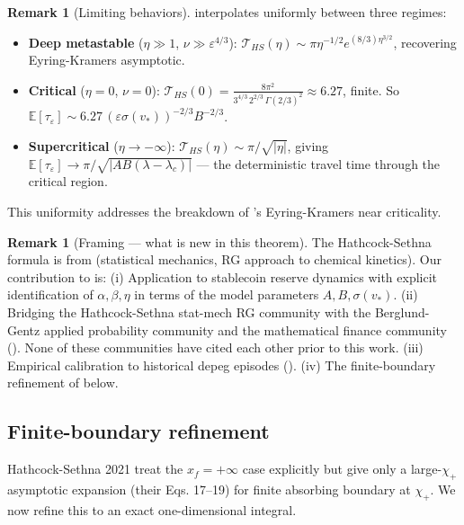 \documentclass[11pt,a4paper]{article}
\theoremstyle{plain}
\theoremstyle{definition}
\newtheorem{remark}[theorem]{Remark}
\newcommand{\E}{\mathbb{E}}
\newcommand{\eps}{\varepsilon}
\begin{document}
\begin{remark}[Limiting behaviors]
 interpolates uniformly between three regimes:
\begin{itemize}
\item \textbf{Deep metastable} ($\eta \gg 1$, $\nu \gg \eps^{4/3}$): $\mathcal T_{HS}(\eta) \sim \pi\eta^{-1/2}e^{(8/3)\eta^{3/2}}$, recovering  Eyring-Kramers asymptotic.
\item \textbf{Critical} ($\eta = 0$, $\nu = 0$): $\mathcal T_{HS}(0) = \frac{8\pi^2}{3^{4/3}\,2^{2/3}\,\Gamma(2/3)^2} \approx 6.27$, finite. So $\E[\tau_\eps] \sim 6.27\,(\eps\sigma(v_*))^{-2/3}B^{-2/3}$.
\item \textbf{Supercritical} ($\eta \to -\infty$): $\mathcal T_{HS}(\eta) \sim \pi/\sqrt{|\eta|}$, giving $\E[\tau_\eps] \to \pi/\sqrt{|AB(\lambda - \lambda_c)|}$ — the deterministic travel time through the critical region.
\end{itemize}
This uniformity addresses the breakdown of 's Eyring-Kramers near criticality.
\end{remark}

\begin{remark}[Framing — what is new in this theorem]
The Hathcock-Sethna formula is from \cite{HathcockSethna2021} (statistical mechanics, RG approach to chemical kinetics). Our contribution to  is:
(i) Application to stablecoin reserve dynamics with explicit identification of $\alpha, \beta, \eta$ in terms of the model parameters $A, B, \sigma(v_*)$.
(ii) Bridging the Hathcock-Sethna stat-mech RG community with the Berglund-Gentz applied probability community \cite{BerglundGentz2006} and the mathematical finance community (\cite{CaoDaiKouLiYang2025, KlagesMundtMinca2022, MohantyKrishnamachari2026}). None of these communities have cited each other prior to this work.
(iii) Empirical calibration to historical depeg episodes ().
(iv) The finite-boundary refinement of  below.
\end{remark}

\subsection{Finite-boundary refinement}

Hathcock-Sethna 2021 treat the $x_f = +\infty$ case explicitly but give only a large-$\chi_+$ asymptotic expansion (their Eqs. 17--19) for finite absorbing boundary at $\chi_+$. We now refine this to an exact one-dimensional integral.
\end{document}
